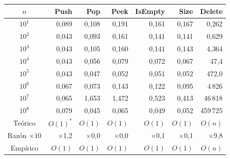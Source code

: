 \begin{tabular}{crrrrrr}
\toprule
$n$ & \textbf{Push} & \textbf{Pop} & \textbf{Peek} & \textbf{IsEmpty} & \textbf{Size} & \textbf{Delete} \\
\midrule
$10^{1}$ & 0{,}089 & 0{,}108 & 0{,}191 & 0{,}161 & 0{,}167 & 0{,}262 \\
$10^{2}$ & 0{,}043 & 0{,}093 & 0{,}161 & 0{,}141 & 0{,}141 & 0{,}629 \\
$10^{3}$ & 0{,}043 & 0{,}105 & 0{,}160 & 0{,}141 & 0{,}143 & 4{,}364 \\
$10^{4}$ & 0{,}043 & 0{,}056 & 0{,}079 & 0{,}072 & 0{,}067 & 47{,}4 \\
$10^{5}$ & 0{,}043 & 0{,}047 & 0{,}052 & 0{,}051 & 0{,}052 & 472{,}0 \\
$10^{6}$ & 0{,}067 & 0{,}073 & 0{,}143 & 0{,}122 & 0{,}095 & 4\,826 \\
$10^{7}$ & 0{,}065 & 1{,}653 & 1{,}472 & 0{,}523 & 0{,}413 & 46\,818 \\
$10^{8}$ & 0{,}079 & 0{,}045 & 0{,}065 & 0{,}049 & 0{,}052 & 459\,725 \\
\midrule
Teórico & $O(1)^{*}$ & $O(1)$ & $O(1)$ & $O(1)$ & $O(1)$ & $O(n)$ \\
Razón $\times 10$ & $\times$1{,}2 & $\times$0{,}0 & $\times$0{,}0 & $\times$0{,}1 & $\times$0{,}1 & $\times$9{,}8 \\
Empírico & $O(1)$ & $O(1)$ & $O(1)$ & $O(1)$ & $O(1)$ & $O(n)$ \\
\bottomrule
\end{tabular}